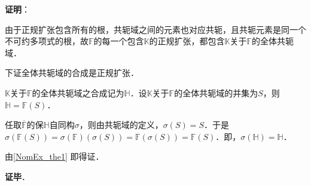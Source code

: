 \textbf{证明}：

由于正规扩张包含所有的根，共轭域之间的元素也对应共轭，且共轭元素是同一个不可约多项式的根，故$\mathbb{F}$的每一个包含$\mathbb{K}$的正规扩张，都包含$\mathbb{K}$关于$\mathbb{F}$的全体共轭域．

下证全体共轭域的合成是正规扩张．

$\mathbb{K}$关于$\mathbb{F}$的全体共轭域之合成记为$\mathbb{H}$．设$\mathbb{K}$关于$\mathbb{F}$的全体共轭域的并集为$S$，则$\mathbb{H}=\mathbb{F}(S)$．

任取$\overline{\mathbb{F}}$的保$\mathbb{H}$自同构$\sigma$，则由共轭域的定义，$\sigma(S)=S$．于是$\sigma(\mathbb{F}(S))=\sigma(\mathbb{F})(\sigma(S))=\mathbb{F}(\sigma(S))=\mathbb{F}(S)$．即，$\sigma(\mathbb{H})=\mathbb{H}$．

由\autoref{NomEx_the1} 即得证．

\textbf{证毕}．
















